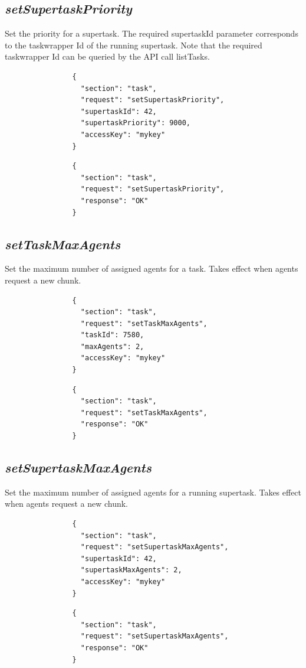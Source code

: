 		\subsection*{\textit{setSupertaskPriority}}
			Set the priority for a supertask.
			The required supertaskId parameter corresponds to the taskwrapper Id of the running supertask.
			Note that the required taskwrapper Id can be queried by the API call listTasks.
			{
				\color{blue}
				\begin{verbatim}
				{
				  "section": "task",
				  "request": "setSupertaskPriority",
				  "supertaskId": 42,
				  "supertaskPriority": 9000,
				  "accessKey": "mykey"
				}
				\end{verbatim}
			}
			{
				\color{OliveGreen}
				\begin{verbatim}
				{
				  "section": "task",
				  "request": "setSupertaskPriority",
				  "response": "OK"
				}
				\end{verbatim}
			}
		\subsection*{\textit{setTaskMaxAgents}}
			Set the maximum number of assigned agents for a task. Takes effect when agents request a new chunk.
			{
				\color{blue}
				\begin{verbatim}
				{
				  "section": "task",
				  "request": "setTaskMaxAgents",
				  "taskId": 7580,
				  "maxAgents": 2,
				  "accessKey": "mykey"
				}
				\end{verbatim}
			}
			{
				\color{OliveGreen}
				\begin{verbatim}
				{
				  "section": "task",
				  "request": "setTaskMaxAgents",
				  "response": "OK"
				}
				\end{verbatim}
			}
		\subsection*{\textit{setSupertaskMaxAgents}}
			Set the maximum number of assigned agents for a running supertask. Takes effect when agents request a new chunk.
			{
				\color{blue}
				\begin{verbatim}
				{
				  "section": "task",
				  "request": "setSupertaskMaxAgents",
				  "supertaskId": 42,
				  "supertaskMaxAgents": 2,
				  "accessKey": "mykey"
				}
				\end{verbatim}
			}
			{
				\color{OliveGreen}
				\begin{verbatim}
				{
				  "section": "task",
				  "request": "setSupertaskMaxAgents",
				  "response": "OK"
				}
				\end{verbatim}
			}
